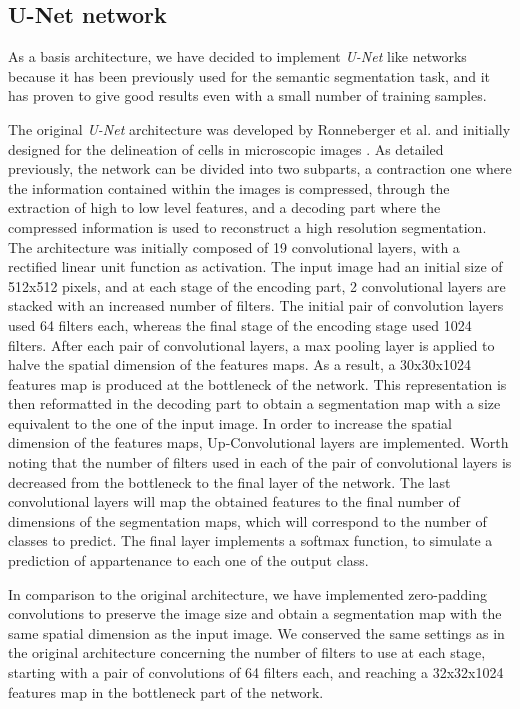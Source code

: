 \documentclass[]{article}
\begin{document}
	
	\subsection*{U-Net network}
	
	As a basis architecture, we have decided to implement \emph{U-Net} like
	networks because it has been previously used for the semantic
	segmentation task, and it has proven to give good results even with a
	small number of training samples.
	
	The original \emph{U-Net} architecture was developed by Ronneberger et
	al. and initially designed for the
	delineation of cells in microscopic images \cite{Ronneberger2015}. As detailed previously, the
	network can be divided into two subparts, a contraction one where the
	information contained within the images is compressed, through the
	extraction of high to low level features, and a decoding part where the
	compressed information is used to reconstruct a high resolution
	segmentation. The architecture was initially composed of 19
	convolutional layers, with a rectified linear unit function as
	activation. The input image had an initial size of 512x512 pixels, and
	at each stage of the encoding part, 2 convolutional layers are stacked
	with an increased number of filters. The initial pair of convolution
	layers used 64 filters each, whereas the final stage of the encoding
	stage used 1024 filters. After each pair of convolutional layers, a max
	pooling layer is applied to halve the spatial dimension of the features
	maps. As a result, a 30x30x1024 features map is produced at the
	bottleneck of the network. This representation is then reformatted in
	the decoding part to obtain a segmentation map with a size equivalent to
	the one of the input image. In order to increase the spatial dimension
	of the features maps, Up-Convolutional layers are implemented. Worth
	noting that the number of filters used in each of the pair of
	convolutional layers is decreased from the bottleneck to the final layer
	of the network. The last convolutional layers will map the obtained
	features to the final number of dimensions of the segmentation maps,
	which will correspond to the number of classes to predict. The final
	layer implements a softmax function, to simulate a prediction of
	appartenance to each one of the output class.
	
	In comparison to the original architecture, we have implemented
	zero-padding convolutions to preserve the image size and obtain a
	segmentation map with the same spatial dimension as the input image. We
	conserved the same settings as in the original architecture concerning
	the number of filters to use at each stage, starting with a pair of
	convolutions of 64 filters each, and reaching a 32x32x1024 features map
	in the bottleneck part of the network.
	
\end{document}
